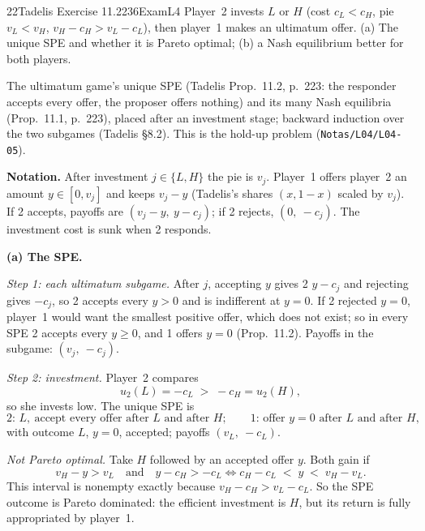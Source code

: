 \begin{exsol}{22}{Tadelis Exercise 11.2}{236}{Exam}{L4}
\asked Player~2 invests $L$ or $H$ (cost $c_L < c_H$, pie $v_L < v_H$, $v_H - c_H > v_L - c_L$),
then player~1 makes an ultimatum offer. (a) The unique SPE and whether it is Pareto optimal;
(b) a Nash equilibrium better for both players.

\method The ultimatum game's unique SPE (Tadelis Prop.~11.2, p.~223: the responder accepts every
offer, the proposer offers nothing) and its many Nash equilibria (Prop.~11.1, p.~223), placed after
an investment stage; backward induction over the two subgames (Tadelis \S8.2). This is the hold-up
problem (\texttt{Notas/L04/L04-05}).

\solution
\textbf{Notation.} After investment $j \in \{L, H\}$ the pie is $v_j$. Player~1 offers player~2 an
amount $y \in [0, v_j]$ and keeps $v_j - y$ (Tadelis's shares $(x, 1-x)$ scaled by $v_j$). If 2
accepts, payoffs are $(v_j - y,\ y - c_j)$; if 2 rejects, $(0,\ -c_j)$. The investment cost is sunk
when 2 responds.

\textbf{(a) The SPE.}

\emph{Step 1: each ultimatum subgame.} After $j$, accepting $y$ gives 2 $y - c_j$ and rejecting
gives $-c_j$, so 2 accepts every $y > 0$ and is indifferent at $y = 0$. If 2 rejected $y = 0$,
player~1 would want the smallest positive offer, which does not exist; so in every SPE 2 accepts
every $y \ge 0$, and 1 offers $y = 0$ (Prop.~11.2). Payoffs in the subgame: $(v_j,\ -c_j)$.

\emph{Step 2: investment.} Player~2 compares
\[
  u_2(L) = -c_L \;>\; -c_H = u_2(H),
\]
so she invests low. The unique SPE is
\[
  \text{2: } L,\ \text{accept every offer after } L \text{ and after } H; \qquad
  \text{1: offer } y = 0 \text{ after } L \text{ and after } H,
\]
with outcome $L$, $y = 0$, accepted; payoffs $(v_L,\ -c_L)$.

\emph{Not Pareto optimal.} Take $H$ followed by an accepted offer $y$. Both gain if
\[
  v_H - y > v_L \quad\text{and}\quad y - c_H > -c_L
  \iff c_H - c_L \;<\; y \;<\; v_H - v_L .
\]
This interval is nonempty exactly because $v_H - c_H > v_L - c_L$. So the SPE outcome is Pareto
dominated: the efficient investment is $H$, but its return is fully appropriated by player~1.


\end{exsol}
